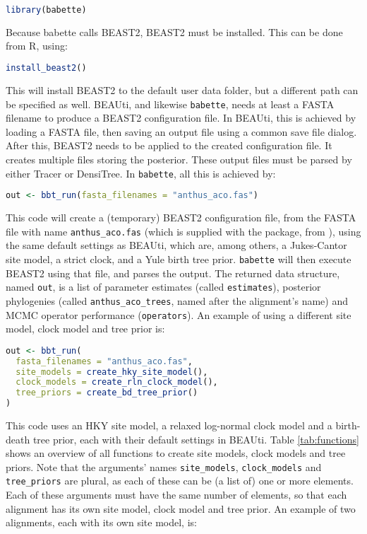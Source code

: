 \documentclass{article}
\begin{document}
\begin{lstlisting}[language=R, floatplacement=H]
library(babette)
\end{lstlisting}
Because babette calls BEAST2, BEAST2 must be installed. This can be done from R, using:

\begin{lstlisting}[language=R, floatplacement=H]
install_beast2()
\end{lstlisting}
This will install BEAST2 to the default user data folder, but a different path can be specified as well.
BEAUti, and likewise \verb;babette;, needs at least a FASTA filename
to produce a BEAST2 configuration file. 
In BEAUti, this is achieved by loading a FASTA file, 
then saving an output file using a common
save file dialog. After this, BEAST2 needs to be applied to
the created configuration file. It creates multiple files
storing the posterior. These output
files must be parsed by either Tracer or DensiTree.
In \verb;babette;, all this is achieved by:

\begin{lstlisting}[language=R, floatplacement=H]
out <- bbt_run(fasta_filenames = "anthus_aco.fas")
\end{lstlisting}
This code will create a (temporary) BEAST2 configuration file,
from the FASTA file with name \verb;anthus_aco.fas; (which
is supplied with the package, from \cite{VanEls2018}), 
using the same default settings as BEAUti, which are, 
among others, a Jukes-Cantor site model, a strict clock, and a Yule birth tree prior.
\verb;babette; will then execute BEAST2 using that file, and
parses the output. The returned data structure, named \verb;out;, 
is a list of parameter estimates (called \verb;estimates;), posterior 
phylogenies (called \verb;anthus_aco_trees;, named after
the alignment's name) and MCMC operator performance (\verb;operators;).
An example of using a different site model, clock model 
and tree prior is:

\begin{lstlisting}[language=R, floatplacement=H]
out <- bbt_run(
  fasta_filenames = "anthus_aco.fas",
  site_models = create_hky_site_model(),
  clock_models = create_rln_clock_model(),
  tree_priors = create_bd_tree_prior()
)
\end{lstlisting}
This code uses an HKY site model, a relaxed log-normal clock model and a 
birth-death tree prior, each with their default settings in BEAUti.
Table \ref{tab:functions} shows an overview of all functions to 
create site models, clock models and tree priors.
Note that the arguments' names \verb;site_models;, \verb;clock_models; 
and \verb;tree_priors; are plural, as each of these
can be (a list of) one or more elements. Each of these arguments must 
have the same number of elements, so that each alignment has its
own site model, clock model and tree prior. 
An example of two alignments, each with its own site model, is:
\end{document}
